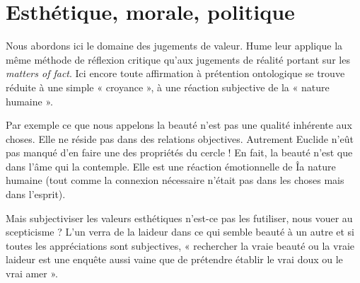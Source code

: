 
\section{Esthétique, morale, politique}
Nous abordons ici le domaine des jugements de valeur.
Hume leur applique la même méthode de réflexion critique
qu'aux jugements de réalité portant sur les {\it matters of fact}.
Ici encore toute affirmation à prétention ontologique se
trouve réduite à une simple « croyance », à une réaction
subjective de la « nature humaine ».

Par exemple ce que nous appelons la beauté n’est pas
une qualité inhérente aux choses. Elle ne réside pas dans
des relations objectives. Autrement Euclide n’eût pas
manqué d’en faire une des propriétés du cercle ! En fait,
la beauté n’est que dans l’âme qui la contemple. Elle
est une réaction émotionnelle de Îa nature humaine (tout
comme la connexion nécessaire n’était pas dans les choses
mais dans l’esprit).

Mais subjectiviser les valeurs esthétiques n'est-ce pas
les futiliser, nous vouer au scepticisme ? L’un verra de la
laideur dans ce qui semble beauté à un autre et si toutes les
appréciations sont subjectives, « rechercher la vraie beauté
ou la vraie laideur est une enquête aussi vaine que de
prétendre établir le vrai doux ou le vrai amer ».

